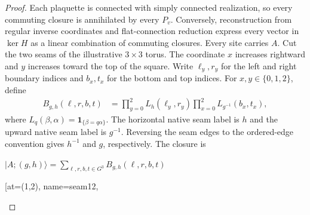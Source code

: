 \begin{proof}\leanok
    Each plaquette is connected with simply connected realization,
    so every commuting closure is annihilated by every $P_v$.
    Conversely, reconstruction from regular inverse coordinates and
    flat-connection reduction express every vector in $\ker H$
    as a linear combination of commuting closures.
    Every site carries $A$. Cut the two seams of the illustrative $3\times3$ torus.
    The coordinate $x$ increases rightward and $y$ increases toward
    the top of the square. Write $\ell_y,r_y$ for the left and right boundary indices and
    $b_x,t_x$ for the bottom and top indices. For $x,y\in\{0,1,2\}$,
    define
    \begin{align}
        B_{g,h}(\ell,r,b,t)
         & =\prod_{y=0}^2 L_h(\ell_y,r_y)
        \prod_{x=0}^2 L_{g^{-1}}(b_x,t_x),
        \label{eq:peps_regular_seam_coefficients}
    \end{align}
    where $L_q(\beta,\alpha)=\mathbf1_{\{\beta=q\alpha\}}$.
    The horizontal native seam label is $h$ and the upward native
    seam label is $g^{-1}$. Reversing the seam edges to the ordered-edge
    convention gives $h^{-1}$ and $g$, respectively. The closure is
    \begin{tenkzequation}
        \tenkzkernel
        $\displaystyle\lvert A;(g,h)\rangle=
            \sum_{\ell,r,b,t\in G^3}B_{g,h}(\ell,r,b,t)$
        \begin{tenkz}[lattice={3x3}, frame=plane, physical=up] %
            \tn[at=(1,1), name=parentSeam,
                ports={180:virtual:$\ell_2$,0:virtual,90:virtual:$t_0$,270:virtual}, label pos=sw]{}
            \tn[at=(1,2), name=seam12,

\end{tenkz}
\end{tenkzequation}
\end{proof}
